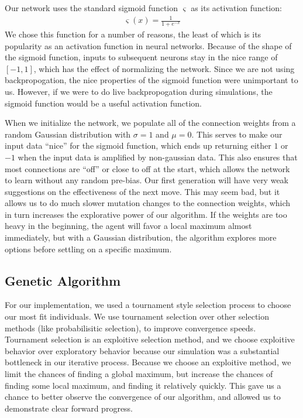 \documentclass{article}
\begin{document}
\begin{multicols}{2}
Our network uses the standard sigmoid function $\varsigma$ as its activation
function:
\begin{align*}
  \varsigma(x) = \frac{1}{1 + e^{-x}}
\end{align*}
We chose this function for a number of reasons, the least of which is its
popularity as an activation function in neural networks. Because of the shape
of the sigmoid function, inputs to subsequent neurons stay in the nice range of
$[-1, 1]$, which has the effect of normalizing the network. Since we are not
using backpropogation, the nice properties of the sigmoid function were
unimportant to us. However, if we were to do live backpropogation during
simulations, the sigmoid function would be a useful activation function.

When we initialize the network, we populate all of the connection weights from
a random Gaussian distribution with $\sigma = 1$ and $\mu = 0$. This serves to
make our input data ``nice'' for the sigmoid function, which ends up returning
either $1$ or $-1$ when the input data is amplified by non-gaussian data. This
also ensures that most connections are ``off'' or close to off at the start,
which allows the network to learn without any random pre-bias. Our first
generation will have very weak suggestions on the effectiveness of the next
move. This may seem bad, but it allows us to do much slower mutation changes to
the connection weights, which in turn increases the explorative power of our
algorithm. If the weights are too heavy in the beginning, the agent will favor
a local maximum almost immediately, but with a Gaussian distribution, the
algorithm explores more options before settling on a specific maximum.

\subsection{Genetic Algorithm}
For our implementation, we used a tournament style selection process to choose
our most fit individuals. We use tournament selection over other selection
methods (like probabilisitic selection), to improve convergence speeds.
Tournament selection is an exploitive selection method, and we choose exploitive
behavior over exploratory behavior because our simulation was a substantial
bottleneck in our iterative process. Because we choose an exploitive method, we
limit the chances of finding a global maximum, but increase the chances of
finding some local maximum, and finding it relatively quickly. This gave us a
chance to better observe the convergence of our algorithm, and allowed us to
demonstrate clear forward progress.


\end{multicols}
\end{document}
